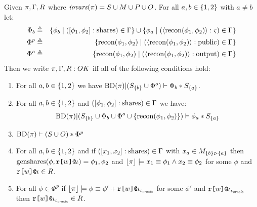 \begin{definition}
  \label{def-OK}
  Given $\pi,\Gamma,R$ where $\mathit{iovars}(\pi) = S \cup M \cup P \cup O$. For all $a,b\in \{ 1,2 \}$ with $a \ne b$ let:
  \begin{eqnarray*}
    \Phi_b & \defeq & \setit{ \phi_b \mid ([\phi_1,\phi_2] : \sharety) \in \Gamma} \cup
                        \setit{ \phi_a \mid (\pubx{\recon(\phi_1,\phi_2)} : \sty) \in \Gamma} \\%
    \Phi^p & \defeq & \setit{ \recon(\phi_1,\phi_2) \mid (\pubx{\recon(\phi_1,\phi_2)} : \pubty) \in \Gamma}\\
    \Phi^o & \defeq & \setit{ \recon(\phi_1,\phi_2) \mid (\pubx{\recon(\phi_1,\phi_2)} : \outty) \in \Gamma}
  \end{eqnarray*}
  Then we write $\pi,\Gamma,R : {OK}$ iff all of the following conditions
  hold:
  \begin{enumerate}[\hspace{5mm}i.]
  \item For all $a,b \in \{ 1,2 \}$ we have
    $
    \mathrm{BD}(\pi)|(S_{\{ b \}} \cup \Phi^o) \vdash \Phi_b * S_{\{ a \}}
    $.
    \item For all $a,b \in \{ 1,2 \}$ and $([\phi_1,\phi_2] : \mathrm{shares}) \in \Gamma$ we have:
    $$\mathrm{BD}(\pi)|(S_{\{ b \}} \cup  \Phi_b \cup \Phi^o \cup \{ \mathrm{recon}(\phi_1,\phi_2) \}) \vdash \phi_a * S_{\{ a \}}$$
  \item $\mathrm{BD}(\pi) \vdash (S \cup O) * \Phi^p$
  \item  For all $a,b \in \{ 1,2 \}$ and if
    $([x_1,x_2] : \mathrm{shares}) \in \Gamma$ with $x_a \in M_{\{ b \} \rhd \{ a \}}$ then
    $\mathrm{genshares}(\phi,\texttt{r[}w\texttt{]}\texttt{@}\iota) = \phi_1,\phi_2$
    and $\lfloor \pi \rfloor \models x_1 \equiv \phi_1 \wedge x_2 \equiv \phi_2$ 
    for some $\phi$ and $\texttt{r[}w\texttt{]}\texttt{@}\iota \in R$.
  \item For all $\phi \in \Phi^p$ if $\lfloor \pi \rfloor \models \phi \equiv \phi' + \texttt{r[}w\texttt{]}\texttt{@}\iota_{\iota_{\mathit{oracle}}}$ for some $\phi'$
    and $\texttt{r[}w\texttt{]}\texttt{@}\iota_{\iota_{\mathit{oracle}}}$ then $\texttt{r[}w\texttt{]}\texttt{@}\iota_{\iota_{\mathit{oracle}}} \in R$.
  \end{enumerate} 
\end{definition}
